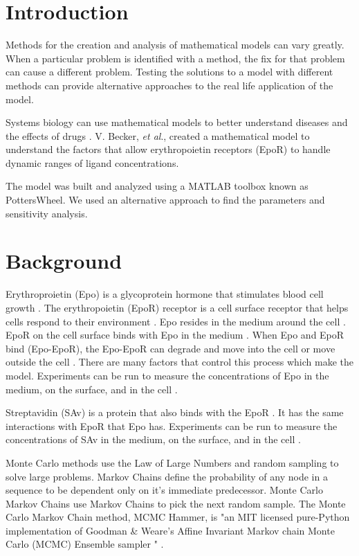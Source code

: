 \documentclass[12pt]{article}
\begin{document}
\section*{Introduction}

Methods for the creation and analysis of mathematical models can vary greatly. When a particular problem is identified with a method, the fix for that problem can cause a different problem. Testing the solutions to a model with different methods can provide alternative approaches to the real life application of the model.

Systems biology can use mathematical models to better understand diseases and the effects of drugs \cite{beck} \cite{bach}. V. Becker, \textit{et al}., \cite{beck} created a mathematical model to understand the factors that allow erythropoietin receptors (EpoR) to handle dynamic ranges of ligand concentrations. 

The model was built and analyzed\cite{beck} using a MATLAB toolbox known as PottersWheel\cite{pott}. We used an alternative approach to find the parameters and sensitivity analysis.

\section*{Background}

Erythroproietin (Epo) is a glycoprotein hormone that stimulates blood cell growth \cite{epo}. The erythropoietin (EpoR) receptor is a cell surface receptor that helps cells respond to their environment \cite{bach}. Epo resides in the medium around the cell \cite{bach}. EpoR on the cell surface binds with Epo in the medium \cite{bach}. When Epo and EpoR bind (Epo-EpoR), the Epo-EpoR can degrade and move into the cell or move outside the cell \cite{bach}. There are many factors that control this process which make the model. Experiments can be run to measure the concentrations of Epo in the medium, on the surface, and in the cell \cite{bach}. 

Streptavidin (SAv) is a protein that also binds with the EpoR \cite{epo}. It has the same interactions with EpoR that Epo has. Experiments can be run to measure the concentrations of SAv in the medium, on the surface, and in the cell \cite{bach}. 

 Monte Carlo methods use the Law of Large Numbers and random sampling to solve large problems. Markov Chains define the probability of any node in a sequence to be dependent only on it's immediate predecessor. Monte Carlo Markov Chains use Markov Chains to pick the next random sample. The Monte Carlo Markov Chain method, MCMC Hammer, is "an MIT licensed pure-Python implementation of Goodman \& Weare’s Affine Invariant Markov chain Monte Carlo (MCMC) Ensemble sampler \cite{good}" \cite{emcee}.
\end{document}
